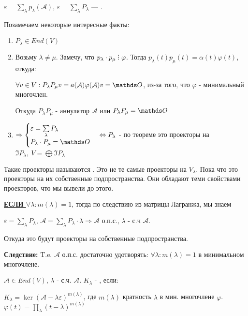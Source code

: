 $\varepsilon = \sum\limits_{\lambda}p_{\lambda}(\mathcal{A})$, $\varepsilon = \sum\limits_{\lambda}P_{\lambda}$ --- .

Позамечаем некоторые интересные факты:
\begin{enumerate}
    \item $P_{\lambda} \in End(V)$
    \item Возьму $\lambda \neq \mu$. Замечу, что $ p_{\lambda}\cdot p_{\mu} \divby \varphi$. Тогда $p_{\lambda}(t) p_{\mu}(t) = \alpha(t)\varphi(t)$, откуда:
    
    $\forall v \in V: P_{\lambda}P_{\mu}v =  a(\mathcal{A})\varphi(\mathcal{A})v = \zero$, из-за того, что $\varphi$ - минимальный многочлен.
    
    Откуда $ P_{\lambda}P_{\mu}$ - аннулятор $\mathcal{A}$ или $ P_{\lambda}P_{\mu} = \zero$

    \item $\Rightarrow \begin{cases}
    \varepsilon = \sum\limits_{\lambda}P_{\lambda}\\
    P_{\lambda}\cdot P_{\mu} =\zero 
\end{cases} \Leftrightarrow P_{\lambda}$  - по теореме это проекторы на $\Im P_{\lambda} , \ V= \bigoplus \Im P_{\lambda}$
\end{enumerate}

Такие проекторы называются . Это не те самые проекторы на $V_{\lambda}$. Пока что это проекторы на их собственные подпространства. Они обладают теми свойствами проекторов, что мы вывели до этого.

\textbf{\uline{ЕСЛИ  $\forall \lambda: m(\lambda)=1$}}, тогда по следствию из матрицы Лагранжа, мы знаем 

$\varepsilon = \sum\limits_{\lambda}P_{\lambda} $, $\mathcal{A} = \sum\limits_{\lambda}P_{\lambda}\cdot \lambda \Rightarrow \mathcal{A}$ о.п.с., $\lambda$ - с.ч $\mathcal{A}$.

Откуда это будут проекторы на собственные подпространства.

\textbf{Следствие:} T.e. $\mathcal{A}$ о.п.с. достаточно удотворять: $\forall \lambda : m(\lambda) = 1$ в минимальном многочлене.

 $\mathcal{A} \in End(V)$, $\lambda$ - с.ч. $\mathcal{A}$. $K_{\lambda}$ - , если:

$K_{\lambda} = \ker (\mathcal{A}- \lambda \varepsilon)^{m(\lambda)}$, где $m(\lambda)$ кратность $\lambda$ в мин. многочлене $\varphi$. $\varphi(t)=\prod\limits_{\lambda}(t-\lambda)^{m(\lambda)}$

